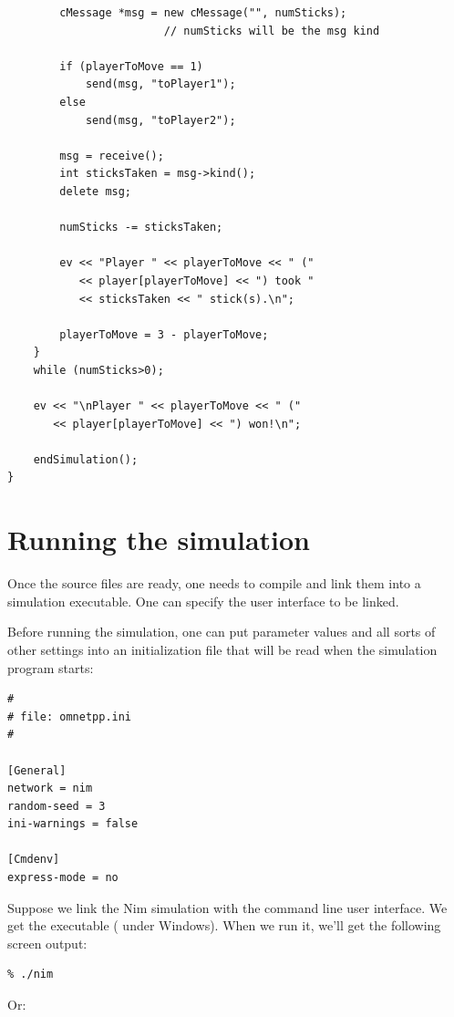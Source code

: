 \begin{verbatim}
        cMessage *msg = new cMessage("", numSticks);
                        // numSticks will be the msg kind

        if (playerToMove == 1)
            send(msg, "toPlayer1");
        else
            send(msg, "toPlayer2");

        msg = receive();
        int sticksTaken = msg->kind();
        delete msg;

        numSticks -= sticksTaken;

        ev << "Player " << playerToMove << " ("
           << player[playerToMove] << ") took "
           << sticksTaken << " stick(s).\n";

        playerToMove = 3 - playerToMove;
    }
    while (numSticks>0);

    ev << "\nPlayer " << playerToMove << " ("
       << player[playerToMove] << ") won!\n";

    endSimulation();
}
\end{verbatim}




\section{Running the simulation}

Once the source files are ready, one needs to compile and link
them into a simulation executable. One can specify the user interface
to be linked.

Before running the simulation, one can put parameter values and
all sorts of other settings into an initialization file that
will be read when the simulation program starts:


\begin{verbatim}
#
# file: omnetpp.ini
#

[General]
network = nim
random-seed = 3
ini-warnings = false

[Cmdenv]
express-mode = no
\end{verbatim}

Suppose we link the Nim simulation with the command line user
interface. We get the executable  ( under Windows).
When we run it, we'll get the following screen output:

\begin{verbatim}
% ./nim
\end{verbatim}

Or:

